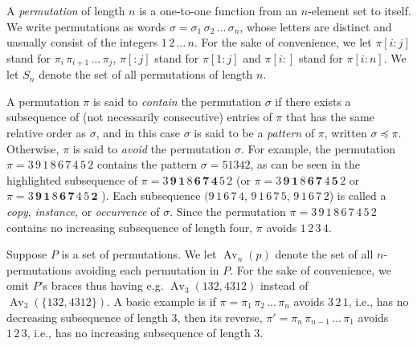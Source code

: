 \documentclass[a4paper]{llncs}
\DeclareMathOperator{\RED}{red}
\DeclareMathOperator{\AV}{Av}
\begin{document}
A \emph{permutation} of length $n$ is a one-to-one function from an
$n$-element set to itself.
We write permutations as words 
$\sigma = \sigma_1\,\sigma_2\,\ldots\,\sigma_n$, whose letters are distinct
and uasually consist of the integers $1\,2\,\ldots\,n$.
For the sake of convenience, 
we let 
$\pi[i:j]$ stand for 
$\pi_i\,\pi_{i+1}\,\ldots\,\pi_j$,
$\pi[:j]$ stand for $\pi[1:j]$ and
$\pi[i:]$ stand for $\pi[i:n]$.
We let $S_n$ denote the set of all permutations of length $n$.


A permutation $\pi$ is said to \emph{contain} the permutation $\sigma$ 
if there exists a subsequence of (not necessarily consecutive) 
entries of $\pi$ that has the same relative order as $\sigma$, 
and in this case $\sigma$ is said to be a \emph{pattern} of 
$\pi$, written $\sigma \preceq \pi$. 
Otherwise, $\pi$ is said to \emph{avoid} the permutation $\sigma$. 
For example, the permutation $\pi = 3\,9\,1\,8\,6\,7\,4\,5\,2$ 
contains the pattern $\sigma = 51342$, 
as can be seen in the highlighted subsequence of 
$\pi = 3\,\mathbf{9}\,\mathbf{1}\,8\,\mathbf{6}\,\mathbf{7}\,\mathbf{4}\,5\,2$
(or 
$\pi = 3\,\mathbf{9}\,\mathbf{1}\,8\,\mathbf{6}\,\mathbf{7}\,4\,\mathbf{5}\,2$
or
$\pi = 3\,\mathbf{9}\,\mathbf{1}\,8\,\mathbf{6}\,\mathbf{7}\,4\,5\,\mathbf{2}$
). 
Each subsequence $(9\,1\,6\,7\,4$, 
$9\,1\,6\,7\,5$, 
$9\,1\,6\,7\,2$) is called a 
\emph{copy}, 
\emph{instance}, or 
\emph{occurrence} of $\sigma$. 
Since the permutation $\pi = 3\,9\,1\,8\,6\,7\,4\,5\,2$  contains no increasing subsequence of length four, $\pi$ avoids $1\,2\,3\,4$.

Suppose $P$ is a set of permutations. We let $\AV_n(p)$ denote the
set of all $n$-permutations avoiding each permutation in $P$.
For the sake of convenience, we omit $P$'s braces thus having
e.g. $\AV_3(132,4312)$ instead of
$\AV_3(\{132,4312\})$.
A basic example is if 
$\pi = \pi_1\,\pi_2\,\ldots\,\pi_n$ avoids $3\,2\,1$, i.e., 
has no decreasing subsequence of length $3$, then its reverse, 
$\pi' = \pi_n\,\pi_{n-1}\,\ldots\,\pi_1$ avoids $1\,2\,3$, i.e., 
has no increasing subsequence of length $3$.
\end{document}
